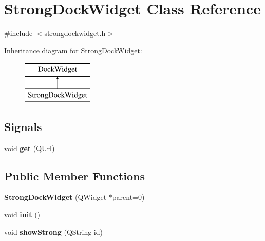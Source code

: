 \hypertarget{classStrongDockWidget}{
\section{StrongDockWidget Class Reference}
\label{classStrongDockWidget}
}


{\ttfamily \#include $<$strongdockwidget.h$>$}

Inheritance diagram for StrongDockWidget:\begin{figure}[H]
\begin{center}
\leavevmode
\includegraphics[height=2cm]{classStrongDockWidget}
\end{center}
\end{figure}
\subsection*{Signals}
\begin{DoxyCompactItemize}
\item 
\hypertarget{classStrongDockWidget_a7002b5f175c25bf174bfe1c57c3a585a}{
void {\bfseries get} (QUrl)}
\label{classStrongDockWidget_a7002b5f175c25bf174bfe1c57c3a585a}

\end{DoxyCompactItemize}
\subsection*{Public Member Functions}
\begin{DoxyCompactItemize}
\item 
\hypertarget{classStrongDockWidget_abfb68051011c50c79404019c8ea54ab1}{
{\bfseries StrongDockWidget} (QWidget $\ast$parent=0)}
\label{classStrongDockWidget_abfb68051011c50c79404019c8ea54ab1}

\item 
\hypertarget{classStrongDockWidget_ae0aadb22296d0906d84168a448b31db6}{
void {\bfseries init} ()}
\label{classStrongDockWidget_ae0aadb22296d0906d84168a448b31db6}

\item 
\hypertarget{classStrongDockWidget_a0dbfec2c920d90c380b4641dde61611c}{
void {\bfseries showStrong} (QString id)}
\label{classStrongDockWidget_a0dbfec2c920d90c380b4641dde61611c}

\end{DoxyCompactItemize}
